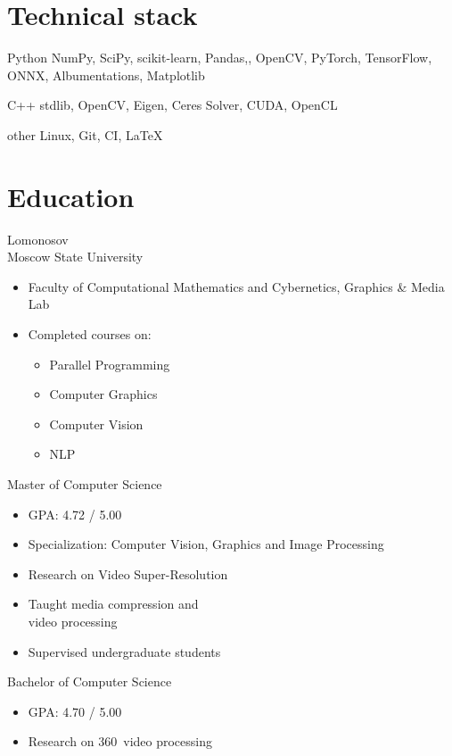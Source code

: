 \documentclass{tccv}
\newcommand{\sphere}{360\textdegree~}
\begin{document}
\section{Technical stack}

\begin{factlist}

\item{Python}
     {NumPy, SciPy, scikit-learn, Pandas,, OpenCV, PyTorch, TensorFlow, ONNX, Albumentations, Matplotlib}

\item{C++}
     {stdlib, OpenCV, Eigen, Ceres Solver, CUDA, OpenCL}

\item{other}
     {Linux, Git, CI, \LaTeX}

\end{factlist}

\vfill

\section{Education}

\begin{eventlist}

\evententry{}
     {Lomonosov\\Moscow State University}
     {}
\vspace{-10pt}
\begin{itemize}
     \item Faculty of Computational Mathematics and Cybernetics, Graphics \& Media Lab
     \item Completed courses on:
     \begin{itemize}
          \item Parallel Programming
          \item Computer Graphics
          \item Computer Vision
          \item NLP
     \end{itemize}
\end{itemize}

     {}
     {Master of Computer Science}
\begin{itemize}
     \item GPA: 4.72 / 5.00
     \item Specialization: Computer Vision, Graphics and Image Processing
     \item Research on Video Super-Resolution
     \item Taught media compression and \\ video processing
     \item Supervised undergraduate students
\end{itemize}

     {}
     {Bachelor of Computer Science}
\begin{itemize}
     \item GPA: 4.70 / 5.00
     \item Research on \sphere video processing 
\end{itemize}

\end{eventlist}
\end{document}
